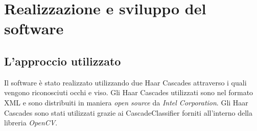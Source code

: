 \graphicspath{ {img/5/} }
\chapter{Realizzazione e sviluppo del software}\label{cap:software}
\thispagestyle{empty} %
\newpage
\section{L'approccio utilizzato}
\vspace{8mm}
Il software è stato realizzato utilizzando due Haar Cascades attraverso i quali vengono riconosciuti occhi e viso. Gli Haar Cascades utilizzati sono nel formato \ac{XML} e sono distribuiti in maniera \emph{open source} da \emph{Intel Corporation}.
Gli Haar Cascades sono stati utilizzati grazie ai CascadeClassifier forniti all'interno della libreria \emph{OpenCV}.


